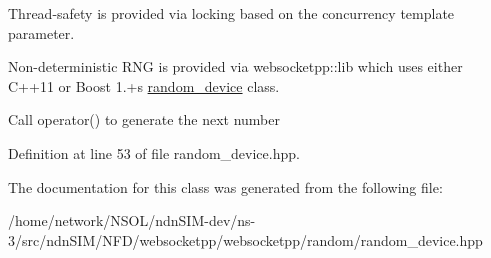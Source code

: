 Thread-\/safety is provided via locking based on the concurrency template parameter.

Non-\/deterministic R\+NG is provided via websocketpp\+::lib which uses either C++11 or Boost 1.+\textquotesingle{}s \hyperlink{namespacewebsocketpp_1_1random_1_1random__device}{random\+\_\+device} class.

Call operator() to generate the next number 

Definition at line 53 of file random\+\_\+device.\+hpp.



The documentation for this class was generated from the following file\+:\begin{DoxyCompactItemize}
\item 
/home/network/\+N\+S\+O\+L/ndn\+S\+I\+M-\/dev/ns-\/3/src/ndn\+S\+I\+M/\+N\+F\+D/websocketpp/websocketpp/random/random\+\_\+device.\+hpp\end{DoxyCompactItemize}

